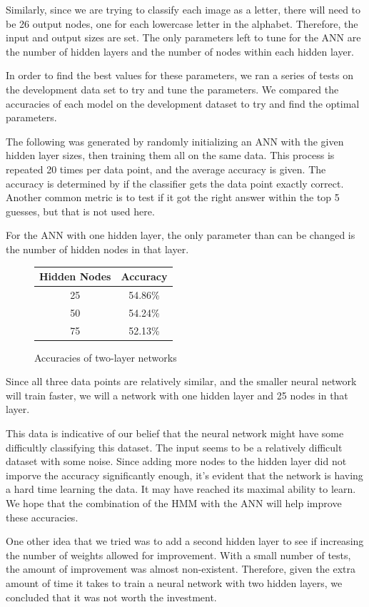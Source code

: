 \documentclass[11pt,a4paper,twocolumn]{article}
\begin{document}
Similarly, since we are trying to classify each image as a letter, there will need to be 26 output nodes, one for each lowercase letter in the alphabet. Therefore, the input and output sizes are set. The only parameters left to tune for the ANN are the number of hidden layers and the number of nodes within each hidden layer.

In order to find the best values for these parameters, we ran a series of tests on the development data set to try and tune the parameters. We compared the accuracies of each model on the development dataset to try and find the optimal parameters.

The following was generated by randomly initializing an ANN with the given hidden layer sizes, then training them all on the same data. This process is repeated 20 times per data point, and the average accuracy is given. The accuracy is determined by if the classifier gets the data point exactly correct. Another common metric is to test if it got the right answer within the top 5 guesses, but that is not used here.

For the ANN with one hidden layer, the only parameter than can be changed is the number of hidden nodes in that layer.
\begin{figure}[h]
\caption{Accuracies of two-layer networks}
\centering
\begin{tabular}{|c|c|}
\hline 
Hidden Nodes & Accuracy \\ 
\hline 
25 & 54.86\% \\ 
\hline 
50 & 54.24\% \\ 
\hline 
75 & 52.13\% \\ 
\hline 
\end{tabular} 
\end{figure}

Since all three data points are relatively similar, and the smaller neural network will train faster, we will a network with one hidden layer and 25 nodes in that layer.

This data is indicative of our belief that the neural network might have some difficultly classifying this dataset. The input seems to be a relatively difficult dataset with some noise. Since adding more nodes to the hidden layer did not imporve the accuracy significantly enough, it's evident that the network is having a hard time learning the data. It may have reached its maximal ability to learn. We hope that the combination of the HMM with the ANN will help improve these accuracies.

One other idea that we tried was to add a second hidden layer to see if increasing the number of weights allowed for improvement. With a small number of tests, the amount of improvement was almost non-existent. Therefore, given the extra amount of time it takes to train a neural network with two hidden layers, we concluded that it was not worth the investment.
\end{document}
